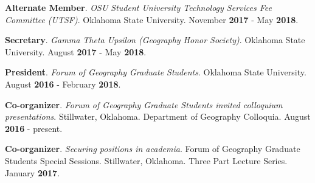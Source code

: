 \begin{cventries}
  \cventry
    {}
    {}
    {}
    {}
    {
       \begin{cvitems}
          \vspace{-3mm}
        \item {\textbf{Alternate Member}. \textit{OSU Student University
              Technology Services Fee Committee (UTSF)}. Oklahoma State
            University. November \textbf{2017} - May \textbf{2018}.}
          \end{cvitems}
          }

  \cventry
    {}
    {}
    {}
    {}
    {
       \begin{cvitems}
          \vspace{-3mm}
        \item {\textbf{Secretary}. \textit{Gamma Theta Upsilon (Geography Honor
              Society)}. Oklahoma State University. August \textbf{2017} -
            May \textbf{2018}.}
          \end{cvitems}
          }

  \cventry
    {}
    {}
    {}
    {}
    {
       \begin{cvitems}
          \vspace{-3mm}
        \item {\textbf{President}. \textit{Forum of Geography Graduate
              Students}. Oklahoma State University. August \textbf{2016} -
            February \textbf{2018}.} 
          \end{cvitems}
          }

  \cventry
    {}
    {}
    {}
    {}
    {
       \begin{cvitems}
          \vspace{-3mm}
        \item {\textbf{Co-organizer}. \textit{Forum of Geography Graduate
              Students invited colloquium presentations}. Stillwater, Oklahoma.
            Department of Geography Colloquia. August \textbf{2016} - present.}
          \end{cvitems}
          }
  \cventry
    {}
    {}
    {}
    {}
    {
       \begin{cvitems}
          \vspace{-3mm}
        \item {\textbf{Co-organizer}. \textit{Securing positions in academia}.
            Forum of Geography Graduate Students Special Sessions. Stillwater,
            Oklahoma. Three Part Lecture Series. January \textbf{2017}.}
          \end{cvitems}
          }


\end{cventries}
